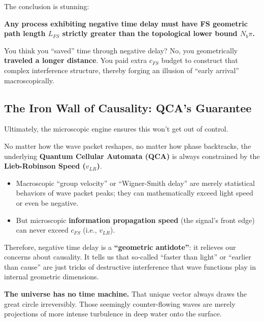 The conclusion is stunning:

\textbf{Any process exhibiting negative time delay must have FS geometric path length $L_{FS}$ strictly greater than the topological lower bound $N_b \pi$.}

You think you ``saved'' time through negative delay? No, you geometrically \textbf{traveled a longer distance}. You paid extra $c_{FS}$ budget to construct that complex interference structure, thereby forging an illusion of ``early arrival'' macroscopically.

\subsection{The Iron Wall of Causality: QCA's Guarantee}

Ultimately, the microscopic engine ensures this won't get out of control.

No matter how the wave packet reshapes, no matter how phase backtracks, the underlying \textbf{Quantum Cellular Automata (QCA)} is always constrained by the \textbf{Lieb-Robinson Speed ($v_{LR}$)}.

\begin{itemize}
\item Macroscopic ``group velocity'' or ``Wigner-Smith delay'' are merely statistical behaviors of wave packet peaks; they can mathematically exceed light speed or even be negative.

\item But microscopic \textbf{information propagation speed} (the signal's front edge) can never exceed $c_{FS}$ (i.e., $v_{LR}$).
\end{itemize}

Therefore, negative time delay is a \textbf{``geometric antidote''}: it relieves our concerns about causality. It tells us that so-called ``faster than light'' or ``earlier than cause'' are just tricks of destructive interference that wave functions play in internal geometric dimensions.

\textbf{The universe has no time machine.} That unique vector always draws the great circle irreversibly. Those seemingly counter-flowing waves are merely projections of more intense turbulence in deep water onto the surface.


